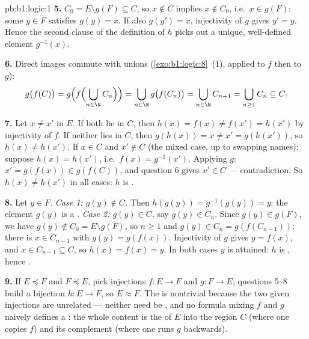 \begin{solution}{pb:b1:logic:1}
\textbf{5.} $C_0 = E \setminus g(F) \subseteq C$, so $x \notin C$
implies $x \notin C_0$, i.e.\ $x \in g(F)$: some $y \in F$ satisfies
$g(y) = x$. If also $g(y') = x$, injectivity of $g$ gives $y' = y$.
Hence the second clause of the definition of $h$ picks out a unique,
well-defined element $g^{-1}(x)$.

\textbf{6.} Direct images commute with unions
(\cref{exo:b1:logic:8}~(1), applied to $f$ then to $g$):
\[
g\bigl(f(C)\bigr)
= g\Bigl(f\Bigl(\bigcup_{n \in \N} C_n\Bigr)\Bigr)
= \bigcup_{n \in \N} g\bigl(f(C_n)\bigr)
= \bigcup_{n \in \N} C_{n+1}
= \bigcup_{n \geq 1} C_n \subseteq C .
\]

\textbf{7.} Let $x \neq x'$ in $E$. If both lie in $C$, then $h(x) =
f(x) \neq f(x') = h(x')$ by injectivity of $f$. If neither lies in
$C$, then $g(h(x)) = x \neq x' = g(h(x'))$, so $h(x) \neq h(x')$. If
$x \in C$ and $x' \notin C$ (the mixed case, up to swapping names):
suppose $h(x) = h(x')$, i.e.\ $f(x) = g^{-1}(x')$. Applying $g$:
$x' = g(f(x)) \in g(f(C))$, and question 6 gives $x' \in C$ ---
contradiction. So $h(x) \neq h(x')$ in all cases: $h$ is .

\textbf{8.} Let $y \in F$. \emph{Case 1: $g(y) \notin C$.} Then
$h(g(y)) = g^{-1}(g(y)) = y$: the element $g(y)$ is a .
\emph{Case 2: $g(y) \in C$}, say $g(y) \in C_n$. Since $g(y) \in
g(F)$, we have $g(y) \notin C_0 = E \setminus g(F)$, so $n \geq 1$
and $g(y) \in C_n = g(f(C_{n-1}))$: there is $x \in C_{n-1}$ with
$g(y) = g(f(x))$. Injectivity of $g$ gives $y = f(x)$, and $x \in
C_{n-1} \subseteq C$, so $h(x) = f(x) = y$. In both cases $y$ is
attained: $h$ is , hence .

\textbf{9.} If $E \preceq F$ and $F \preceq E$, pick injections $f
\colon E \to F$ and $g \colon F \to E$; questions 5--8 build a
bijection $h \colon E \to F$, so $E \approx F$. The  is
nontrivial because the two given injections are unrelated --- neither
need be , and no formula mixing $f$ and $g$ naively defines
a : the whole content is the  of $E$ into the region $C$
(where one copies $f$) and its complement (where one runs $g$
backwards).


\end{solution}
